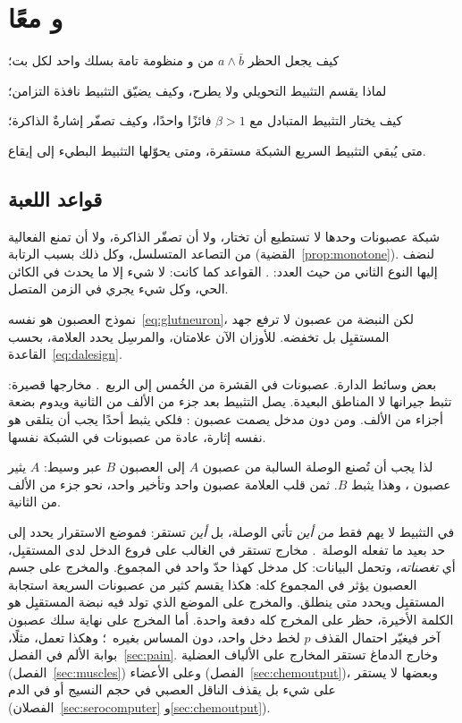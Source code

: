 \chapter{ و معًا}
\label{sec:gaba}
\begin{chaptergoals}
\item كيف يجعل الحظر $a\wedge\bar b$ من  و منظومة تامة بسلك واحد لكل بت؛
\item لماذا يقسم التثبيط التحويلي ولا يطرح، وكيف يضيّق التثبيط نافذة التزامن؛
\item كيف يختار التثبيط المتبادل مع $\beta>1$ فائزًا واحدًا، وكيف تصفّر إشارةٌ الذاكرة؛
\item متى يُبقي التثبيط السريع الشبكة مستقرة، ومتى يحوّلها التثبيط البطيء إلى إيقاع.
\end{chaptergoals}

\section{قواعد اللعبة}

شبكة عصبونات  وحدها لا تستطيع أن تختار، ولا أن تصفّر الذاكرة، ولا أن تمنع الفعالية من التصاعد المتسلسل، وكل ذلك بسبب الرتابة (القضية~\ref{prop:monotone}). لنضف إليها النوع الثاني من حيث العدد: . القواعد كما كانت: لا شيء إلا ما يحدث في الكائن الحي، وكل شيء يجري في الزمن المتصل.

نموذج العصبون هو نفسه~\eqref{eq:glutneuron}، لكن النبضة من عصبون  لا ترفع جهد المستقبِل بل تخفضه. للأوزان الآن علامتان، والمرسِل يحدد العلامة، بحسب القاعدة~\eqref{eq:dalesign}.

بعض وسائط الدارة. عصبونات  في القشرة من الخُمس إلى الربع~\cite{Hendry1987}. مخارجها قصيرة: تثبط جيرانها لا المناطق البعيدة. يصل التثبيط بعد جزء من الألف من الثانية ويدوم بضعة أجزاء من الألف. ومن دون مدخل يصمت عصبون : فلكي يثبط أحدًا يجب أن يتلقى هو نفسه إثارة، عادة من عصبونات  في الشبكة نفسها.

لذا يجب أن تُصنع الوصلة السالبة من عصبون  $A$ إلى العصبون $B$ عبر وسيط: $A$ يثير عصبون ، وهذا يثبط $B$. ثمن قلب العلامة عصبون واحد وتأخير واحد، نحو جزء من الألف من الثانية.

في التثبيط لا يهم فقط \emph{من أين} تأتي الوصلة، بل \emph{أين} تستقر: فموضع الاستقرار يحدد إلى حد بعيد ما تفعله الوصلة~\cite{Markram2004}. مخارج  تستقر في الغالب على فروع الدخل لدى المستقبِل، أي \emph{تغصناته}، وتحمل البيانات: كل مدخل كهذا حدّ واحد في المجموع. والمخرج على جسم العصبون يؤثر في المجموع كله: هكذا يقسم كثير من عصبونات  السريعة استجابة المستقبِل ويحدد متى ينطلق. والمخرج على الموضع الذي تولد فيه نبضة المستقبِل هو الكلمة الأخيرة، حظر على المخرج كله دفعة واحدة. أما المخرج على نهاية سلك عصبون آخر فيغيّر احتمال القذف $p$ لخط دخل واحد، دون المساس بغيره~\cite{Rudomin1999}؛ وهكذا تعمل، مثلًا، بوابة الألم في الفصل~\ref{sec:pain}. وخارج الدماغ تستقر المخارج على الألياف العضلية (الفصل~\ref{sec:muscles}) وعلى الأعضاء (الفصل~\ref{sec:chemoutput})، وبعضها لا يستقر على شيء بل يقذف الناقل العصبي في حجم النسيج أو في الدم (الفصلان~\ref{sec:serocomputer} و\ref{sec:chemoutput}).

